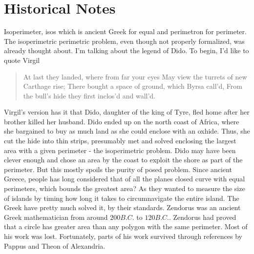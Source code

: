 \documentclass[a4paper]{book}
\begin{document}
\section*{Historical Notes}
Isoperimeter, isos which is ancient Greek for equal and perimetron for perimeter. The isoperimetric perimetric problem, even though not properly formalized, was already thought about. I'm talking about the legend of Dido. To begin, I'd like to quote Virgil
\begin{center}
\begin{quote}
At last they landed, where from far your eyes
May view the turrets of new Carthage rise;
There bought a space of ground, which Byrsa call'd,
From the bull's hide they first inclos'd and wall'd.
\end{quote}
\end{center}
Virgil's version has it that Dido, daughter of the king of Tyre, fled home after her brother killed her husband. Dido ended up on the north coast of Africa, where she bargained to buy as much land as she could enclose with an oxhide. Thus, she cut the hide into thin strips, presumably met and solved enclosing the largest area with a given perimeter - the isoperimetric problem. Dido may have been clever enough and chose an area by the coast to exploit the shore as part of the perimeter. But this mostly spoils the purity of posed problem.
\newline
\newline
Since ancient Greece, people has long considered that of all the planes closed curve with equal perimeters, which bounds the greatest area? As they wanted to measure the size of islands by timing how long it takes to circumnavigate the entire island.
\newline
\newline
The Greek have pretty much solved it, by their standards. Zendorus was an ancient Greek mathematician from around $200B.C.$ to $120B.C.$. Zendorus had proved that a circle has greater area than any polygon with the same perimeter. Most of his work was lost. Fortunately, parts of his work survived through references by Pappus and Theon of Alexandria.
\end{document}
